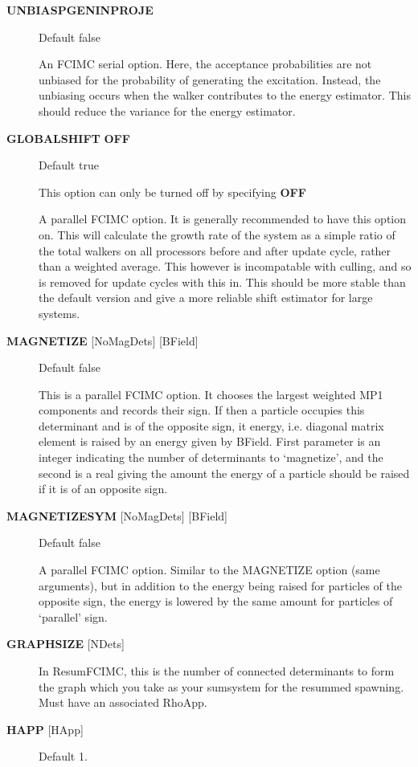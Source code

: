 \documentclass[openany,a4paper,10pt]{manual}
\begin{document}
\begin{description}
\item[\textbf{UNBIASPGENINPROJE}]
Default false

An FCIMC serial option. Here, the acceptance probabilities are not unbiased for
the probability of generating the excitation. Instead, the unbiasing occurs when the
walker contributes to the energy estimator. This should reduce the variance for the
energy estimator.

\item[\textbf{GLOBALSHIFT} \textbf{OFF}]
Default true

This option can only be turned off by specifying \textbf{OFF}

A parallel FCIMC option. It is generally recommended to have this option on. This will
calculate the growth rate of the system as a simple ratio of the total walkers on all processors
before and after update cycle, rather than a weighted average. This however is incompatable with culling, and so
is removed for update cycles with this in. This should be more stable than the
default version and give a more reliable shift estimator for large systems.

\item[\textbf{MAGNETIZE} {[}NoMagDets{]} {[}BField{]}]
Default false

This is a parallel FCIMC option. It chooses the largest weighted MP1 components and records their
sign. If then a particle occupies this determinant and is of the opposite sign, it energy,
i.e. diagonal matrix element is raised by an energy given by BField. First parameter is an
integer indicating the number of determinants to `magnetize', and the second is a real
giving the amount the energy of a particle should be raised if it is of an opposite sign.

\item[\textbf{MAGNETIZESYM} {[}NoMagDets{]} {[}BField{]}]
Default false

A parallel FCIMC option. Similar to the MAGNETIZE option (same arguments), but in addition to
the energy being raised for particles of the opposite sign, the energy is lowered by the same
amount for particles of `parallel' sign.

\item[\textbf{GRAPHSIZE} {[}NDets{]}]
In ResumFCIMC, this is the number of connected determinants to form the
graph which you take as your sumsystem for the resummed spawning.  Must
have an associated RhoApp.

\item[\textbf{HAPP} {[}HApp{]}]
Default 1.


\end{description}
\end{document}
